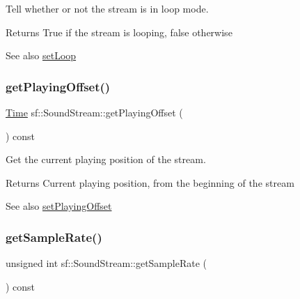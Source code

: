 Tell whether or not the stream is in loop mode. 

\begin{DoxyReturn}{Returns}
True if the stream is looping, false otherwise
\end{DoxyReturn}
\begin{DoxySeeAlso}{See also}
\hyperlink{classsf_1_1_sound_stream_a43fade018ffba7e4f847a9f00b353f3d}{set\+Loop} 
\end{DoxySeeAlso}
\mbox{\label{classsf_1_1_sound_stream_ae288f3c72edbad9cc7ee938ce5b907c1}} 
\subsubsection{\texorpdfstring{get\+Playing\+Offset()}{getPlayingOffset()}}
{\footnotesize\ttfamily \hyperlink{classsf_1_1_time}{Time} sf\+::\+Sound\+Stream\+::get\+Playing\+Offset (\begin{DoxyParamCaption}{ }\end{DoxyParamCaption}) const}



Get the current playing position of the stream. 

\begin{DoxyReturn}{Returns}
Current playing position, from the beginning of the stream
\end{DoxyReturn}
\begin{DoxySeeAlso}{See also}
\hyperlink{classsf_1_1_sound_stream_af416a5f84c8750d2acb9821d78bc8646}{set\+Playing\+Offset} 
\end{DoxySeeAlso}
\mbox{\label{classsf_1_1_sound_stream_a7da448dc40d81a33b8dc555fbf0d3fbf}} 
\subsubsection{\texorpdfstring{get\+Sample\+Rate()}{getSampleRate()}}
{\footnotesize\ttfamily unsigned int sf\+::\+Sound\+Stream\+::get\+Sample\+Rate (\begin{DoxyParamCaption}{ }\end{DoxyParamCaption}) const}



